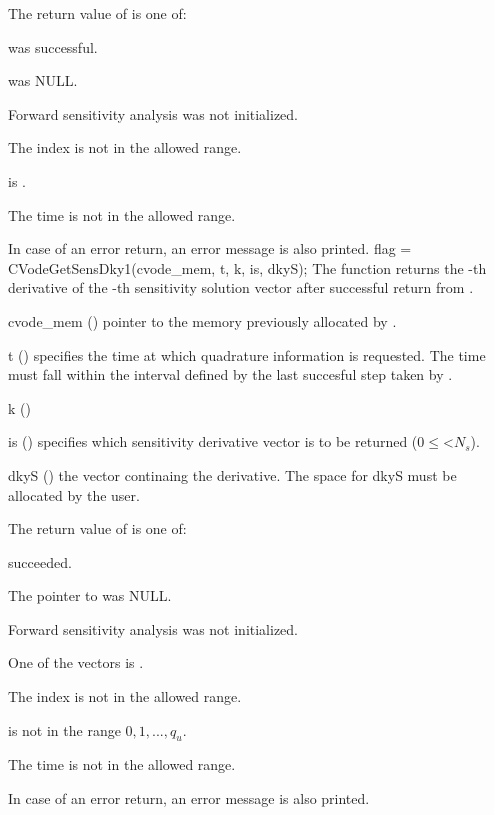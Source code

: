 {
  The return value  of  is one of:
  \begin{args}
  \item[\Id{OKAY}]
     was successful.
  \item[\Id{CVG\_NO\_MEM}] 
     was NULL.
  \item[\Id{CVG\_NO\_SENS}] 
    Forward sensitivity analysis was not initialized.
  \item[\Id{BAD\_IS}]
    The index  is not in the allowed range.
  \item[\Id{BAD\_DKY}] 
     is .
  \item[\Id{BAD\_T}] 
    The time  is not in the allowed range.
  \end{args}
}
{
  In case of an error return, an error message is also printed.  
}
{
  flag = CVodeGetSensDky1(cvode\_mem, t, k, is, dkyS);
}
{
  The function  returns the -th derivative of the 
  -th sensitivity solution vector after successful return from .
}
{
  \begin{args}
  \item[cvode\_mem] ()
    pointer to the memory previously allocated by .
  \item[t] ()
    specifies the time at which quadrature information is 
    requested. The time  must fall within the interval defined by the last 
    succesful step taken by {\cvodes}.
  \item[k] ()
  \item[is] () specifies which sensitivity derivative vector is to be returned
    ($0\le$<$N_s$).
  \item[dkyS] ()
    the vector continaing the derivative. The space for dkyS must be allocated by 
    the user. 
  \end{args}
}
{
  The return value  of  is one of:
  \begin{args}
  \item[\Id{OKAY}] 
     succeeded.
  \item[\Id{CVG\_NO\_MEM}] 
    The pointer to  was NULL.
  \item[\Id{CVG\_NO\_SENS}] 
    Forward sensitivity analysis was not initialized.
  \item[\Id{BAD\_DKY}] 
    One of the vectors  is .
  \item[\Id{BAD\_IS}]
    The index  is not in the allowed range.
  \item[\Id{BAD\_K}] 
     is not in the range $0, 1, ..., q_u$.
  \item[\Id{BAD\_T}] 
    The time  is not in the allowed range.
  \end{args}
}
{
  In case of an error return, an error message is also printed.  
}

